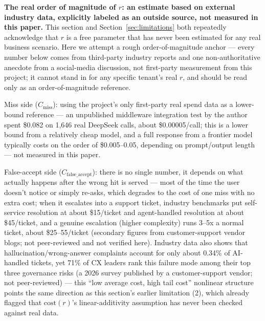 \documentclass[11pt]{article}
\begin{document}
\textbf{The real order of magnitude of $r$: an estimate based on external industry data, explicitly labeled as an outside source, not measured in this paper.} This section and Section~\ref{sec:limitations} both repeatedly acknowledge that $r$ is a free parameter that has never been estimated for any real business scenario. Here we attempt a rough order-of-magnitude anchor --- every number below comes from third-party industry reports and one non-authoritative anecdote from a social-media discussion, not first-party measurement from this project; it cannot stand in for any specific tenant's real $r$, and should be read only as an order-of-magnitude reference.

Miss side ($C_{\text{miss}}$): using the project's only first-party real spend data as a lower-bound reference --- an unpublished middleware integration test by the author spent \$0.082 on 1{,}646 real DeepSeek calls, about \$0.00005/call; this is a lower bound from a relatively cheap model, and a full response from a frontier model typically costs on the order of \$0.005--0.05, depending on prompt/output length --- not measured in this paper.

False-accept side ($C_{\text{false\_accept}}$): there is no single number, it depends on what actually happens after the wrong hit is served --- most of the time the user doesn't notice or simply re-asks, which degrades to the cost of one miss with no extra cost; when it escalates into a support ticket, industry benchmarks put self-service resolution at about \$15/ticket and agent-handled resolution at about \$45/ticket, and a genuine escalation (higher complexity) runs 3--5x a normal ticket, about \$25--55/ticket (secondary figures from customer-support vendor blogs; not peer-reviewed and not verified here). Industry data also shows that hallucination/wrong-answer complaints account for only about 0.34\% of AI-handled tickets, yet 71\% of CX leaders rank this failure mode among their top three governance risks (a 2026 survey published by a customer-support vendor; not peer-reviewed) --- this ``low average cost, high tail cost'' nonlinear structure points the same direction as this section's earlier limitation (2), which already flagged that $\text{cost}(r)$'s linear-additivity assumption has never been checked against real data.
\end{document}
